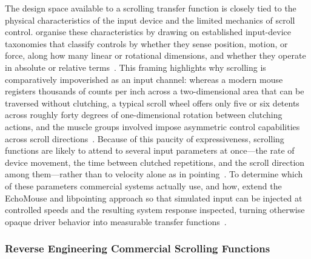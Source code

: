 The design space available to a scrolling transfer function is closely tied to the physical characteristics of the input device and the limited mechanics of scroll control. \citeauthor{quinn2012exposing} organise these characteristics by drawing on established input-device taxonomies that classify controls by whether they sense position, motion, or force, along how many linear or rotational dimensions, and whether they operate in absolute or relative terms~\cite{quinn2012exposing}. This framing highlights why scrolling is comparatively impoverished as an input channel: whereas a modern mouse registers thousands of counts per inch across a two-dimensional area that can be traversed without clutching, a typical scroll wheel offers only five or six detents across roughly forty degrees of one-dimensional rotation between clutching actions, and the muscle groups involved impose asymmetric control capabilities across scroll directions~\cite{quinn2012exposing}. Because of this paucity of expressiveness, scrolling functions are likely to attend to several input parameters at once---the rate of device movement, the time between clutched repetitions, and the scroll direction among them---rather than to velocity alone as in pointing~\cite{quinn2012exposing}. To determine which of these parameters commercial systems actually use, and how, \citeauthor{quinn2012exposing} extend the EchoMouse and libpointing approach so that simulated input can be injected at controlled speeds and the resulting system response inspected, turning otherwise opaque driver behavior into measurable transfer functions~\cite{quinn2012exposing}. 

\subsubsection{Reverse Engineering Commercial Scrolling Functions}

